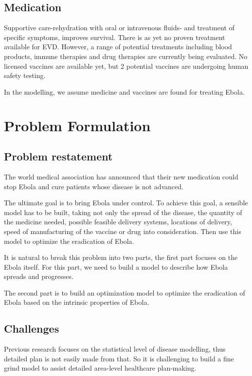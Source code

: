 \documentclass[12pt]{article}
\begin{document}
\subsection{Medication}

Supportive care-rehydration with oral or intravenous fluids- and treatment of specific symptoms, improves survival. There is as yet no proven treatment available for EVD. However, a range of potential treatments including blood products, immune therapies and drug therapies are currently being evaluated. No licensed vaccines are available yet, but 2 potential vaccines are undergoing human safety testing.

In the modelling, we assume medicine and vaccines are found for treating Ebola.


\section{Problem Formulation}



\subsection{Problem restatement}

The world medical association has announced that their new medication could stop Ebola and cure patients whose disease is not advanced. 

The ultimate goal is to bring Ebola under control. To achieve this goal, a sensible model has to be built, taking not only the spread of the disease, the quantity of the medicine needed, possible feasible delivery systems, locations of delivery, speed of manufacturing of the vaccine or drug into consideration. Then use this model to optimize the eradication of Ebola.

It is natural to break this problem into two parts, the first part focuses on the Ebola itself. For this part, we need to build a model to describe how Ebola spreads and progresses. 

The second part is to build an optimization model to optimize the eradication of Ebola based on the intrinsic properties of Ebola. 
\subsection{Challenges}

Previous research focuses on the statistical level of disease modelling, thus detailed plan is not easily made from that. So it is challenging to build a fine grind model to assist detailed area-level healthcare plan-making.
\end{document}
